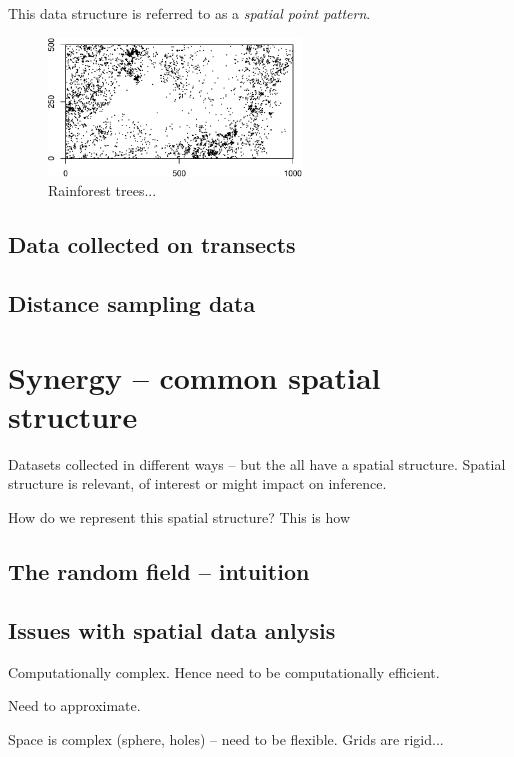 \documentclass[authoryear]{book}
\theoremstyle{definition}
\begin{document}
This data structure is referred to as a \textit{spatial point pattern}.
\begin{figure}
\centering
\includegraphics[width=0.6\textwidth]{rain_pattern}
\caption{\label{fig:pattern} Rainforest trees...}
\end{figure}




\subsection{Data collected on transects}
\subsection{Distance sampling data}


\section{Synergy -- common spatial structure}
Datasets collected in different ways -- but the all have 
a spatial structure. Spatial structure is relevant, of interest or might impact on inference.

How do we represent this spatial structure? This is how 

\subsection{The random field -- intuition}



\subsection{Issues with spatial data anlysis}

Computationally complex. Hence need to be computationally efficient.

Need to approximate.

Space is complex (sphere, holes) -- need to be flexible. Grids are rigid... 
\end{document}
